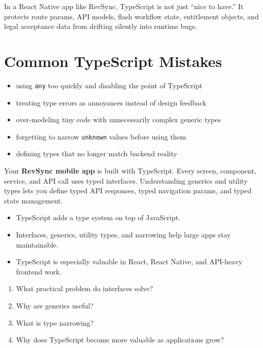 \documentclass[12pt, a4paper, oneside]{book}
\begin{document}
\begin{projectbox}
In a React Native app like RevSync, TypeScript is not just ``nice to have.'' It protects route params, API models, flash workflow state, entitlement objects, and legal acceptance data from drifting silently into runtime bugs.
\end{projectbox}

\section{Common TypeScript Mistakes}

\begin{itemize}[leftmargin=2em]
    \item using \texttt{any} too quickly and disabling the point of TypeScript
    \item treating type errors as annoyances instead of design feedback
    \item over-modeling tiny code with unnecessarily complex generic types
    \item forgetting to narrow \texttt{unknown} values before using them
    \item defining types that no longer match backend reality
\end{itemize}

\begin{projectbox}
Your \textbf{RevSync mobile app} is built with TypeScript. Every screen, component, service, and API call uses typed interfaces. Understanding generics and utility types lets you define typed API responses, typed navigation params, and typed state management.
\end{projectbox}

\begin{summarybox}
\begin{itemize}[leftmargin=2em]
    \item TypeScript adds a type system on top of JavaScript.
    \item Interfaces, generics, utility types, and narrowing help large apps stay maintainable.
    \item TypeScript is especially valuable in React, React Native, and API-heavy frontend work.
\end{itemize}
\end{summarybox}

\begin{recallbox}
\begin{enumerate}[leftmargin=2em]
    \item What practical problem do interfaces solve?
    \item Why are generics useful?
    \item What is type narrowing?
    \item Why does TypeScript become more valuable as applications grow?
\end{enumerate}
\end{recallbox}
\end{document}
